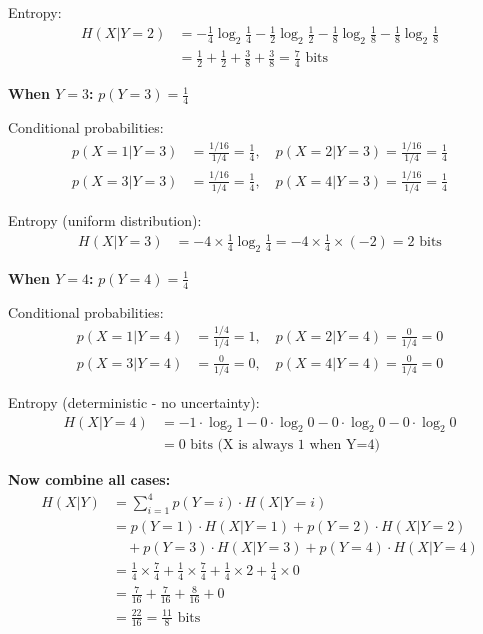 \documentclass[11pt,a4paper]{book}
\newcounter{qna}[chapter]
\renewcommand{\theqna}{\thechapter.\arabic{qna}}
\newenvironment{questionanswerbox}{
    \refstepcounter{qna}%
    \begin{tcolorbox}[
        enhanced,
        breakable,
        colback=softlavender!10,
        colframe=softlavender!200,
        title={Example~\theqna}, %
        fonttitle=\bfseries,
        coltitle=white,
        colbacktitle=softlavender!200,
        sharp corners,
        boxrule=1pt,
        left=8pt,
        right=8pt,
        top=6pt,
        bottom=6pt
    ]
}{
    \end{tcolorbox}
}
\begin{document}
\begin{questionanswerbox}
    Entropy:
    \begin{align*}
    H(X|Y=2) &= -\frac{1}{4}\log_2\frac{1}{4} - \frac{1}{2}\log_2\frac{1}{2} - \frac{1}{8}\log_2\frac{1}{8} - \frac{1}{8}\log_2\frac{1}{8} \\
    &= \frac{1}{2} + \frac{1}{2} + \frac{3}{8} + \frac{3}{8} = \frac{7}{4} \text{ bits}
    \end{align*}
    
    \hrulefill
    
    \textbf{When \(Y=3\):} \(p(Y=3) = \frac{1}{4}\)
    
    Conditional probabilities:
    \begin{align*}
    p(X=1|Y=3) &= \frac{1/16}{1/4} = \frac{1}{4}, \quad
    p(X=2|Y=3) = \frac{1/16}{1/4} = \frac{1}{4} \\
    p(X=3|Y=3) &= \frac{1/16}{1/4} = \frac{1}{4}, \quad
    p(X=4|Y=3) = \frac{1/16}{1/4} = \frac{1}{4}
    \end{align*}
    
    Entropy (uniform distribution):
    \begin{align*}
    H(X|Y=3) &= -4 \times \frac{1}{4}\log_2\frac{1}{4} = -4 \times \frac{1}{4} \times (-2) = 2 \text{ bits}
    \end{align*}
    
    \hrulefill
    
    \textbf{When \(Y=4\):} \(p(Y=4) = \frac{1}{4}\)
    
    Conditional probabilities:
    \begin{align*}
    p(X=1|Y=4) &= \frac{1/4}{1/4} = 1, \quad
    p(X=2|Y=4) = \frac{0}{1/4} = 0 \\
    p(X=3|Y=4) &= \frac{0}{1/4} = 0, \quad
    p(X=4|Y=4) = \frac{0}{1/4} = 0
    \end{align*}
    
    Entropy (deterministic - no uncertainty):
    \begin{align*}
    H(X|Y=4) &= -1 \cdot \log_2 1 - 0 \cdot \log_2 0 - 0 \cdot \log_2 0 - 0 \cdot \log_2 0 \\
    &= 0 \text{ bits (X is always 1 when Y=4)}
    \end{align*}
    
    \hrulefill
    
    \textbf{Now combine all cases:}
    \begin{align*}
    H(X|Y) &= \sum_{i=1}^{4} p(Y=i) \cdot H(X|Y=i) \\
    &= p(Y=1) \cdot H(X|Y=1) + p(Y=2) \cdot H(X|Y=2) \\
    &\quad + p(Y=3) \cdot H(X|Y=3) + p(Y=4) \cdot H(X|Y=4) \\
    &= \frac{1}{4} \times \frac{7}{4} + \frac{1}{4} \times \frac{7}{4} + \frac{1}{4} \times 2 + \frac{1}{4} \times 0 \\
    &= \frac{7}{16} + \frac{7}{16} + \frac{8}{16} + 0 \\
    &= \frac{22}{16} = \frac{11}{8} \text{ bits}
    \end{align*}
    

\end{questionanswerbox}
\end{document}
